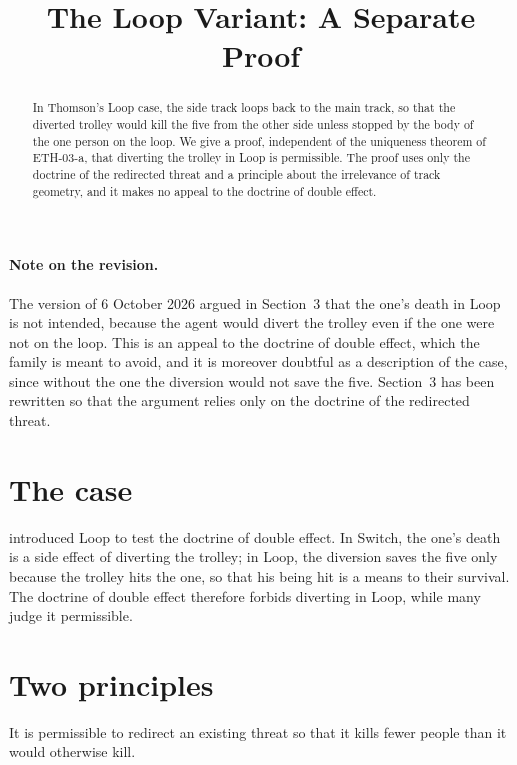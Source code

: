 \documentclass{situationist-preprint}
\title{The Loop Variant: A Separate Proof}
\begin{document}
\maketitle

\begin{abstract}
In Thomson's Loop case, the side track loops back to the main track, so that the diverted trolley would kill the five from the other side unless stopped by the body of the one person on the loop. We give a proof, independent of the uniqueness theorem of ETH-03-a, that diverting the trolley in Loop is permissible. The proof uses only the doctrine of the redirected threat and a principle about the irrelevance of track geometry, and it makes no appeal to the doctrine of double effect.
\end{abstract}

\paragraph{Note on the revision.} The version of 6 October 2026 argued in Section~3 that the one's death in Loop is not intended, because the agent would divert the trolley even if the one were not on the loop. This is an appeal to the doctrine of double effect, which the family is meant to avoid, and it is moreover doubtful as a description of the case, since without the one the diversion would not save the five. Section~3 has been rewritten so that the argument relies only on the doctrine of the redirected threat.

\section{The case}

\citet{Thomson1985} introduced Loop to test the doctrine of double effect. In Switch, the one's death is a side effect of diverting the trolley; in Loop, the diversion saves the five only because the trolley hits the one, so that his being hit is a means to their survival. The doctrine of double effect therefore forbids diverting in Loop, while many judge it permissible.

\section{Two principles}

\begin{principle}[Redirection]\label{p:drt}
It is permissible to redirect an existing threat so that it kills fewer people than it would otherwise kill.
\end{principle}
\end{document}
